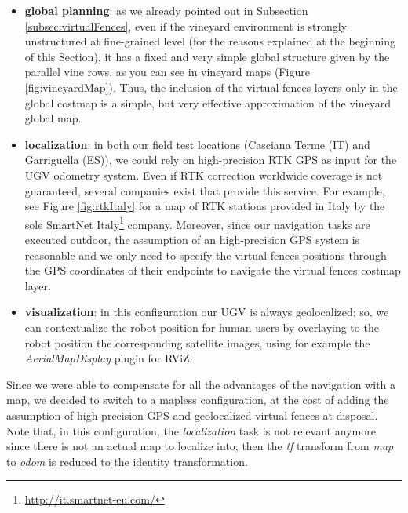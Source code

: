 \begin{itemize}
	\item \textbf{global planning}: as we already pointed out in Subsection \ref{subsec:virtualFences}, even if the vineyard environment is strongly unstructured at fine-grained level (for the reasons explained at the beginning of this Section), it has a fixed and very simple global structure given by the parallel vine rows, as you can see in vineyard maps (Figure \ref{fig:vineyardMap}). Thus, the inclusion of the virtual fences layers only in the global costmap is a simple, but very effective approximation of the vineyard global map.
	\item \textbf{localization}: in both our field test locations (Casciana Terme (IT) and Garriguella (ES)), we could rely on high-precision RTK GPS \parencite{rtk} as input for the \ac{UGV} odometry system. Even if RTK correction worldwide coverage is not guaranteed, several companies exist that provide this service. For example, see Figure \ref{fig:rtkItaly} for a map of RTK stations provided in Italy by the sole SmartNet Italy\footnote{\url{http://it.smartnet-eu.com/}}
company. Moreover, since our navigation tasks are executed outdoor, the assumption of an high-precision GPS system is reasonable and we only need to specify the virtual fences positions through the GPS coordinates of their endpoints to navigate the virtual fences costmap layer.
	\item \textbf{visualization}: in this configuration our \ac{UGV} is always geolocalized; so, we can contextualize the robot position for human users by overlaying to the robot position the corresponding satellite images, using for example the \textit{AerialMapDisplay} plugin for RViZ.
\end{itemize}
Since we were able to compensate for all the advantages of the navigation with a map, we decided to switch to a mapless configuration, at the cost of adding the assumption of high-precision GPS and geolocalized virtual fences at disposal. Note that, in this configuration, the \textit{localization} task is not relevant anymore since there is not an actual map to localize into; then the \textit{tf} transform from \textit{map} to \textit{odom} is reduced to the identity transformation.


